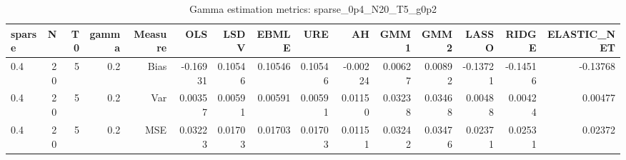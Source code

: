 \begin{table}[!htbp]\centering
\caption{Gamma estimation metrics: sparse_0p4_N20_T5_g0p2}
\label{tab:table1_sparse_0p4_N20_T5_g0p2}
\begin{tabular}{lrrrrrrrrrrrrrr}
\hline
sparse & N & T0 & gamma & Measure & OLS & LSDV & EBMLE & URE & AH & GMM1 & GMM2 & LASSO & RIDGE & ELASTIC_NET \\
\hline
0.4 & 20 & 5 & 0.2 & Bias & -0.16931 & 0.10546 & 0.10546 & 0.10546 & -0.00224 & 0.00627 & 0.00892 & -0.13721 & -0.14516 & -0.13768 \\
0.4 & 20 & 5 & 0.2 & Var & 0.00357 & 0.00591 & 0.00591 & 0.00591 & 0.01150 & 0.03238 & 0.03468 & 0.00488 & 0.00424 & 0.00477 \\
0.4 & 20 & 5 & 0.2 & MSE & 0.03223 & 0.01703 & 0.01703 & 0.01703 & 0.01151 & 0.03242 & 0.03476 & 0.02371 & 0.02531 & 0.02372 \\
\hline
\end{tabular}
\end{table}

